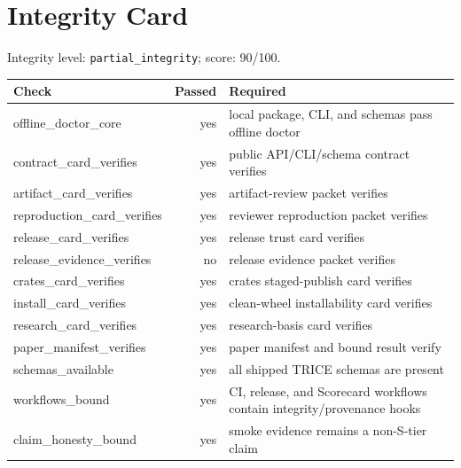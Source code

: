 \section{Integrity Card}
Integrity level: \texttt{partial\_integrity}; score: 90/100.

\begin{tabular}{lrl}
Check & Passed & Required \\
\hline
offline\_doctor\_core & yes & local package, CLI, and schemas pass offline doctor \\
contract\_card\_verifies & yes & public API/CLI/schema contract verifies \\
artifact\_card\_verifies & yes & artifact-review packet verifies \\
reproduction\_card\_verifies & yes & reviewer reproduction packet verifies \\
release\_card\_verifies & yes & release trust card verifies \\
release\_evidence\_verifies & no & release evidence packet verifies \\
crates\_card\_verifies & yes & crates staged-publish card verifies \\
install\_card\_verifies & yes & clean-wheel installability card verifies \\
research\_card\_verifies & yes & research-basis card verifies \\
paper\_manifest\_verifies & yes & paper manifest and bound result verify \\
schemas\_available & yes & all shipped TRICE schemas are present \\
workflows\_bound & yes & CI, release, and Scorecard workflows contain integrity/provenance hooks \\
claim\_honesty\_bound & yes & smoke evidence remains a non-S-tier claim \\
\end{tabular}
